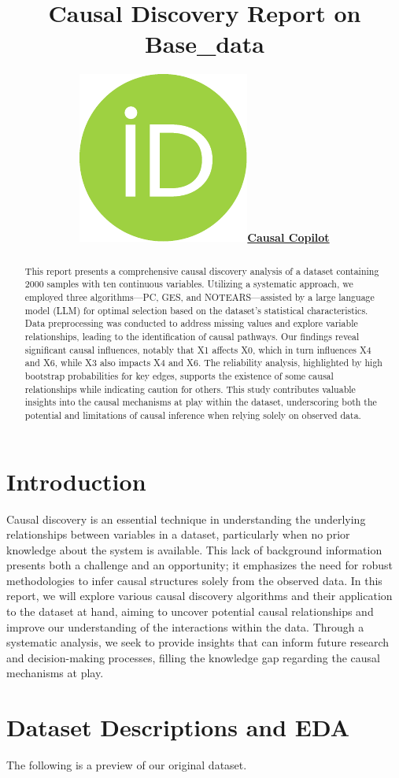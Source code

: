 \documentclass{article}
\title{Causal Discovery Report on Base\_data}
\author{ \href{https://orcid.org/0000-0000-0000-0000}{\includegraphics[scale=0.06]{postprocess/context/orcid.pdf}\hspace{1mm}\textbf{Causal Copilot}}}
\begin{document}
\maketitle

\begin{abstract}
This report presents a comprehensive causal discovery analysis of a dataset containing 2000 samples with ten continuous variables. Utilizing a systematic approach, we employed three algorithms—PC, GES, and NOTEARS—assisted by a large language model (LLM) for optimal selection based on the dataset's statistical characteristics. Data preprocessing was conducted to address missing values and explore variable relationships, leading to the identification of causal pathways. Our findings reveal significant causal influences, notably that X1 affects X0, which in turn influences X4 and X6, while X3 also impacts X4 and X6. The reliability analysis, highlighted by high bootstrap probabilities for key edges, supports the existence of some causal relationships while indicating caution for others. This study contributes valuable insights into the causal mechanisms at play within the dataset, underscoring both the potential and limitations of causal inference when relying solely on observed data.
\end{abstract}


\raggedbottom
\section{Introduction}
Causal discovery is an essential technique in understanding the underlying relationships between variables in a dataset, particularly when no prior knowledge about the system is available. This lack of background information presents both a challenge and an opportunity; it emphasizes the need for robust methodologies to infer causal structures solely from the observed data. In this report, we will explore various causal discovery algorithms and their application to the dataset at hand, aiming to uncover potential causal relationships and improve our understanding of the interactions within the data. Through a systematic analysis, we seek to provide insights that can inform future research and decision-making processes, filling the knowledge gap regarding the causal mechanisms at play.

\section{Dataset Descriptions and EDA}
The following is a preview of our original dataset.
\end{document}
